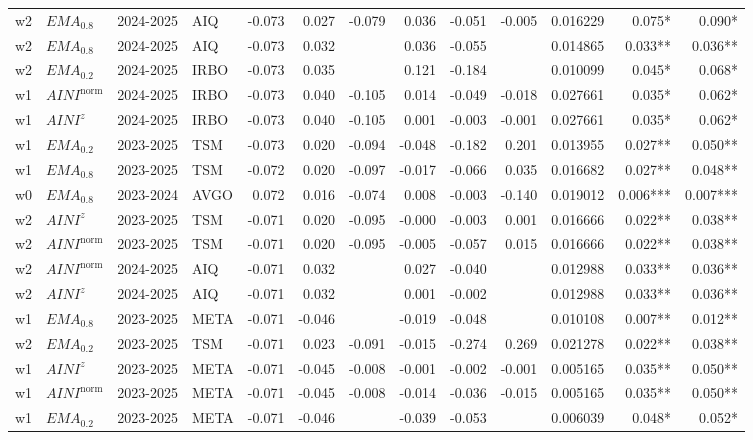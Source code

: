 \begin{longtable}{@{}llllrrrrrrrrr@{}}
w2 & $EMA_{0.8}$ & 2024-2025 & AIQ & -0.073 & 0.027 & -0.079 & 0.036 & -0.051 & -0.005 & 0.016229 & 0.075* & 0.090* \\
w2 & $EMA_{0.8}$ & 2024-2025 & AIQ & -0.073 & 0.032 &  & 0.036 & -0.055 &  & 0.014865 & 0.033** & 0.036** \\
w2 & $EMA_{0.2}$ & 2024-2025 & IRBO & -0.073 & 0.035 &  & 0.121 & -0.184 &  & 0.010099 & 0.045* & 0.068* \\
w1 & $AINI^{\mathrm{norm}}$ & 2024-2025 & IRBO & -0.073 & 0.040 & -0.105 & 0.014 & -0.049 & -0.018 & 0.027661 & 0.035* & 0.062* \\
w1 & $AINI^{z}$ & 2024-2025 & IRBO & -0.073 & 0.040 & -0.105 & 0.001 & -0.003 & -0.001 & 0.027661 & 0.035* & 0.062* \\
w1 & $EMA_{0.2}$ & 2023-2025 & TSM & -0.073 & 0.020 & -0.094 & -0.048 & -0.182 & 0.201 & 0.013955 & 0.027** & 0.050** \\
w1 & $EMA_{0.8}$ & 2023-2025 & TSM & -0.072 & 0.020 & -0.097 & -0.017 & -0.066 & 0.035 & 0.016682 & 0.027** & 0.048** \\
w0 & $EMA_{0.8}$ & 2023-2024 & AVGO & 0.072 & 0.016 & -0.074 & 0.008 & -0.003 & -0.140 & 0.019012 & 0.006*** & 0.007*** \\
w2 & $AINI^{z}$ & 2023-2025 & TSM & -0.071 & 0.020 & -0.095 & -0.000 & -0.003 & 0.001 & 0.016666 & 0.022** & 0.038** \\
w2 & $AINI^{\mathrm{norm}}$ & 2023-2025 & TSM & -0.071 & 0.020 & -0.095 & -0.005 & -0.057 & 0.015 & 0.016666 & 0.022** & 0.038** \\
w2 & $AINI^{\mathrm{norm}}$ & 2024-2025 & AIQ & -0.071 & 0.032 &  & 0.027 & -0.040 &  & 0.012988 & 0.033** & 0.036** \\
w2 & $AINI^{z}$ & 2024-2025 & AIQ & -0.071 & 0.032 &  & 0.001 & -0.002 &  & 0.012988 & 0.033** & 0.036** \\
w1 & $EMA_{0.8}$ & 2023-2025 & META & -0.071 & -0.046 &  & -0.019 & -0.048 &  & 0.010108 & 0.007** & 0.012** \\
w2 & $EMA_{0.2}$ & 2023-2025 & TSM & -0.071 & 0.023 & -0.091 & -0.015 & -0.274 & 0.269 & 0.021278 & 0.022** & 0.038** \\
w1 & $AINI^{z}$ & 2023-2025 & META & -0.071 & -0.045 & -0.008 & -0.001 & -0.002 & -0.001 & 0.005165 & 0.035** & 0.050** \\
w1 & $AINI^{\mathrm{norm}}$ & 2023-2025 & META & -0.071 & -0.045 & -0.008 & -0.014 & -0.036 & -0.015 & 0.005165 & 0.035** & 0.050** \\
w1 & $EMA_{0.2}$ & 2023-2025 & META & -0.071 & -0.046 &  & -0.039 & -0.053 &  & 0.006039 & 0.048* & 0.052* \\

\end{longtable}
